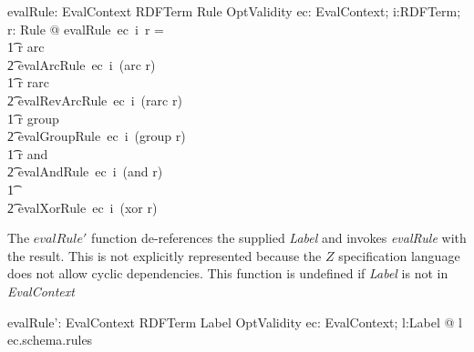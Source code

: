 \documentclass[fuzz]{llncs}
\def\zc{\textit}
\begin{document}
\begin{axdef}
   evalRule: EvalContext \fun RDFTerm \fun Rule \fun OptValidity
\where
   \forall ec: EvalContext; i:RDFTerm; r: Rule @ evalRule~ec~i~r = \\
\t1 \IF r \in \ran arc \\
\t2 \THEN evalArcRule~ec~i~(arc \inv r) \\
\t1 \ELSE \IF r \in \ran rarc \\
\t2 \THEN evalRevArcRule~ec~i~(rarc \inv r) \\
\t1 \ELSE \IF r \in \ran group \\
\t2 \THEN evalGroupRule~ec~i~(group \inv r) \\
\t1 \ELSE \IF r \in \ran and \\
\t2 \THEN evalAndRule~ec~i~(and \inv r) \\
\t1 \ELSE \\
\t2 evalXorRule~ec~i~(xor \inv r)
\end{axdef}
The $evalRule'$ function  de-references the supplied \zc{Label} and
invokes \zc{evalRule} with the result.  This is not explicitly represented because
the $Z$ specification language does not allow cyclic dependencies. This function
is undefined if \zc{Label} is not in \zc{EvalContext}
\begin{axdef}
   evalRule': EvalContext \fun RDFTerm \fun Label \fun OptValidity
\where
   \forall ec: EvalContext; l:Label @ l \in \dom ec.schema.rules
\end{axdef}
\end{document}

